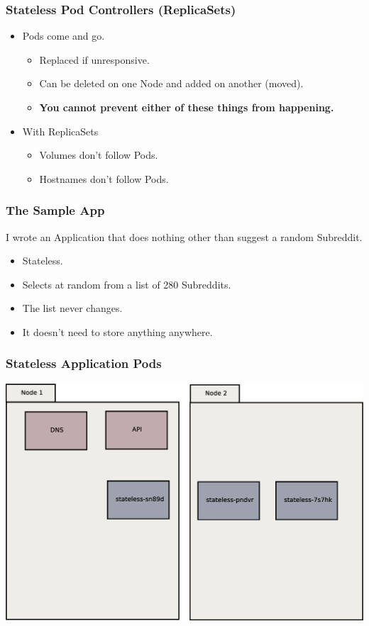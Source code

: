     \begin{frame}
        \frametitle{Stateless Pod Controllers (ReplicaSets)}
        \begin{itemize}
            \item Pods come and go.\pause
            \begin{itemize}
                \item Replaced if unresponsive.\pause
                \item Can be deleted on one Node and added on another (moved).\pause
                \item \textbf{You cannot prevent either of these things from happening.}\pause
            \end{itemize}
            \item With ReplicaSets\pause
            \begin{itemize}
                \item Volumes don't follow Pods.\pause
                \item Hostnames don't follow Pods.
            \end{itemize}
        \end{itemize}
    \end{frame}

    \begin{frame}
        \frametitle{The Sample App}
        I wrote an Application that does nothing other than suggest a random Subreddit.\pause
        \begin{itemize}
            \item Stateless.\pause
            \item Selects at random from a list of 280 Subreddits.\pause
            \item The list never changes.\pause
            \item It doesn't need to store anything anywhere.
        \end{itemize}
    \end{frame}

    \begin{frame}
        \frametitle{Stateless Application Pods}
        \includegraphics[width=\textwidth,height=0.85\textheight,keepaspectratio]{graphics/02-statelessAppPods.eps}
    \end{frame}

